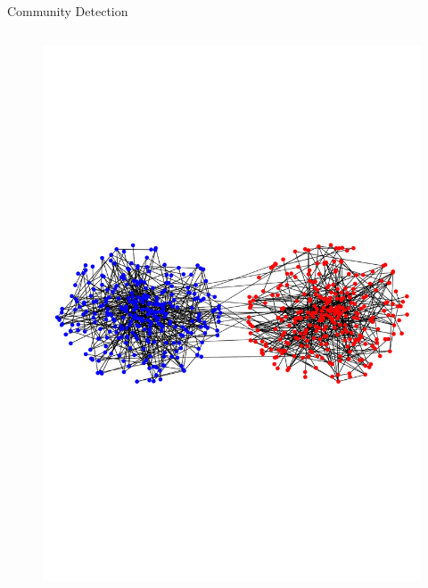 \documentclass{beamer}
\begin{document}
\begin{frame}{Community Detection}
\begin{columns}
\begin{figure}
		\includegraphics[width=\textwidth]{bennot.pdf}
		\end{figure}
	\end{columns}
\end{frame}
\end{document}
